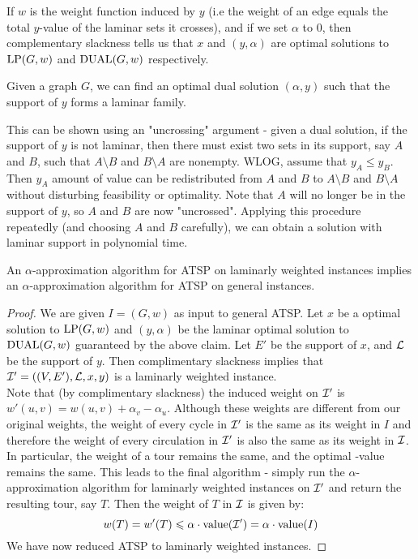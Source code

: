 \documentclass[./main.tex]{subfiles}
\begin{document}
	If $w$ is the weight function induced by $y$ (i.e the weight of an edge equals the total $y$-value of the laminar sets it crosses), and if we set $\alpha$ to $0$, then complementary slackness tells us that $x$ and $(y,\alpha)$ are optimal solutions to $\textup{LP}(G,w)$ and $\textup{DUAL}(G,w)$ respectively.\\

	\begin{claim*}
		Given a graph $G$, we can find an optimal dual solution $(\alpha, y)$ such that the support of $y$ forms a laminar family.
	\end{claim*}

	This can be shown using an "uncrossing" argument - given a dual solution, if the support of $y$ is not laminar, then there must exist two sets in its support, say $A$ and $B$, such that $A\setminus B$ and $B\setminus A$ are nonempty.
	WLOG, assume that $y_A \leqslant y_B$. Then $y_A$ amount of value can be redistributed from $A$ and $B$ to $A\setminus B$ and $B\setminus A$ without disturbing feasibility or optimality.
	Note that $A$ will no longer be in the support of $y$, so $A$ and $B$ are now "uncrossed".
	Applying this procedure repeatedly (and choosing $A$ and $B$ carefully), we can obtain a solution with laminar support in polynomial time.\\
		\begin{theorem}
			An $\alpha$-approximation algorithm for ATSP on laminarly weighted instances implies an $\alpha$-approximation algorithm for ATSP on general instances.
		\end{theorem}
		\begin{proof}
			We are given $I=(G,w)$ as input to general ATSP. Let $x$ be a optimal solution to $\textup{LP}(G,w)$ and $(y,\alpha)$ be the laminar optimal solution to $\textup{DUAL}(G,w)$ guaranteed by the above claim.
			Let $E'$ be the support of $x$, and $\mathcal{L}$ be the support of $y$. Then complimentary slackness implies that $\mathcal{I}'=((V,E'), \mathcal{L}, x, y)$ is a laminarly weighted instance.\\
			Note that (by complimentary slackness) the induced weight on $\mathcal{I}'$ is $w'(u,v) = w(u,v) + \alpha_v - \alpha_u$. Although these weights are different from our original weights, the weight of every cycle in $\mathcal{I}'$ is the same as its weight in $I$ and therefore the weight of every circulation in $\mathcal{I}'$ is also the same as its weight in $\mathcal{I}$. In particular, the weight of a tour remains the same, and the optimal \LP-value remains the same.
			This leads to the final algorithm - simply run the $\alpha$-approximation algorithm for laminarly weighted instances on $\mathcal{I}'$ and return the resulting tour, say $T$.
			Then the weight of $T$ in $\mathcal{I}$ is given by:
			\[
				w(T) = w'(T)\leqslant \alpha\cdot \textup{value}(\mathcal{I}') = \alpha\cdot\textup{value}(I)
			\]
			We have now reduced ATSP to laminarly weighted instances.
		\end{proof}
\end{document}

